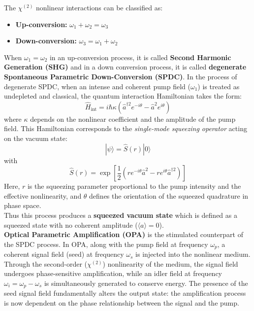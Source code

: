 \documentclass[colorlinks=true,pdfstartview=FitV,linkcolor=blue,
citecolor=red,urlcolor=magenta]{ligodoc}
\begin{document}
The $\chi^{(2)}$ nonlinear interactions can be classified as:
\begin{itemize}
    \item \textbf{Up-conversion:} $\omega_1 + \omega_2 = \omega_3$
    \item \textbf{Down-conversion:} $\omega_3 = \omega_1 + \omega_2$
\end{itemize}
When $\omega_1= \omega_2$ in an up-conversion process, it is called \textbf{Second Harmonic Generation (SHG)} and in a down conversion process, it is called\textbf{ degenerate} \textbf{Spontaneous Parametric Down-Conversion (SPDC)}. In the process of degenerate SPDC, when an intense and coherent pump field ($\omega_1$) is treated as undepleted and classical, the quantum interaction Hamiltonian takes the form:
\begin{equation}
\hat{H}_\text{int} = i \hbar \kappa \left( \hat{a}^{\dagger 2} e^{-i\theta} - \hat{a}^2 e^{i\theta} \right)
\end{equation}
where $\kappa$ depends on the nonlinear coefficient and the amplitude of the pump field. This Hamiltonian corresponds to the \textit{single-mode squeezing operator} acting on the vacuum state:
\begin{equation}
|\psi\rangle = \hat{S}(r) |0\rangle
\end{equation}
with
\begin{equation}
\hat{S}(r) = \exp\left[ \frac{1}{2} \left( r e^{-i\theta} \hat{a}^2 - r e^{i\theta} \hat{a}^{\dagger 2} \right) \right]
\end{equation}
Here, $r$ is the squeezing parameter proportional to the pump intensity and the effective nonlinearity, and $\theta$ defines the orientation of the squeezed quadrature in phase space.\\ 

Thus this process produces a \textbf{squeezed vacuum state} which is defined as a squeezed state with no coherent amplitude ($\langle a \rangle = 0$). \\
 
 \textbf{Optical Parametric Amplification (OPA)} is the stimulated counterpart of the SPDC process. In OPA, along with the pump field at frequency $\omega_p$, a coherent signal field (seed) at frequency $\omega_s$ is injected into the nonlinear medium. Through the second-order ($\chi^{(2)}$) nonlinearity of the medium, the signal field undergoes phase-sensitive amplification, while an idler field at frequency $\omega_i = \omega_p - \omega_s$ is simultaneously generated to conserve energy. The presence of the seed signal field fundamentally alters the output state: the amplification process is now dependent on the phase relationship between the signal and the pump.
\end{document}
